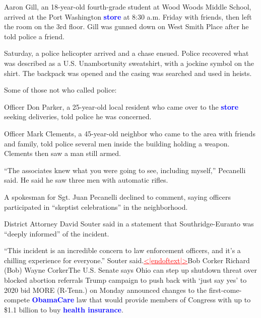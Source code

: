 \documentclass{article}
\begin{document}
\begin{samplebox}[title={\textsc{RePlaid} (s.c.), ancestral sampler, $T = 1024$ (GenPPL: $18.3$, Entropy: $5.21$, MAUVE: $0.85$)}]
\vspace{1em}
Aaron Gill, an 18-year-old fourth-grade student at Wood Woods Middle School, arrived at the Port Washington \textcolor{blue}{\textbf{store}} at 8:30 a.m. Friday with friends, then left the room on the 3rd floor. Gill was gunned down on West Smith Place after he told police a friend.

\vspace{1em}
Saturday, a police helicopter arrived and a chase ensued. Police recovered what was described as a U.S. Unambortunity sweatshirt, with a jockine symbol on the shirt. The backpack was opened and the casing was searched and used in heists.

\vspace{1em}
Some of those not who called police:

\vspace{1em}
Officer Don Parker, a 25-year-old local resident who came over to the \textcolor{blue}{\textbf{store}} seeking deliveries, told police he was concerned.

\vspace{1em}
Officer Mark Clements, a 45-year-old neighbor who came to the area with friends and family, told police several men inside the building holding a weapon. Clements then saw a man still armed.

\vspace{1em}
``The associates knew what you were going to see, including myself,'' Pecanelli said. He said he saw three men with automatic rifles.

\vspace{1em}
A spokesman for Sgt. Juan Pecanelli declined to comment, saying officers participated in ``skeptist celebrations'' in the neighborhood.

\vspace{1em}
District Attorney David Souter said in a statement that Southridge-Euranto was ``deeply informed'' of the incident.

\vspace{1em}
``This incident is an incredible concern to law enforcement officers, and it's a chilling experience for everyone.'' Souter said.\textcolor{red}{\uline{<|endoftext|>}}Bob Corker Richard (Bob) Wayne CorkerThe U.S. Senate says Ohio can step up shutdown threat over blocked abortion referrals Trump campaign to push back with `just say yes' to 2020 bid MORE (R-Tenn.) on Monday announced changes to the first-come-compete \textcolor{blue}{\textbf{ObamaCare}} law that would provide members of Congress with up to \$1.1 billion to buy \textcolor{blue}{\textbf{health insurance}}.


\end{samplebox}
\end{document}
